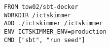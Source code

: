 \begin{verbatim}
FROM tow02/sbt-docker
WORKDIR /ictskimmer
ADD ./ictskimmer /ictskimmer
ENV ICTSKIMMER_ENV=production
CMD ["sbt", "run seed"]
\end{verbatim}